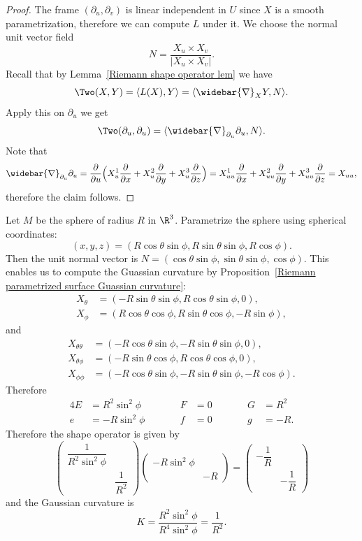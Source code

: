 \begin{proof}
The frame $(\partial_u,\partial_v)$ is linear independent in $U$ since $X$ is a smooth parametrization, therefore we can compute $L$ under it. We choose 
the normal unit vector field
\[N=\frac{X_u\times X_v}{|X_u\times X_v|}.\]
Recall that by Lemma~\ref{Riemann shape operator lem} we have
\[\Two(X,Y)=\langle L(X),Y\rangle=\langle\widebar{\nabla}_XY,N\rangle.\]
Apply this on $\partial_u$ we get
\begin{align*}
\Two(\partial_u,\partial_u)=\langle\widebar{\nabla}_{\partial_u}\partial_u,N\rangle.
\end{align*}
Note that
\[\widebar{\nabla}_{\partial_u}\partial_u=\frac{\partial}{\partial u}\Big(X^1_u\frac{\partial}{\partial x}+X^2_u\frac{\partial}{\partial y}+X^3_u\frac{\partial}{\partial z}\Big)=X^1_{uu}\frac{\partial}{\partial x}+X^2_{uu}\frac{\partial}{\partial y}+X^3_{uu}\frac{\partial}{\partial z}=X_{uu},\]
therefore the claim follows.
\end{proof}
\begin{example}
Let $M$ be the sphere of radius $R$ in $\R^3$. Parametrize the sphere using spherical coordinates:
\[(x,y,z)=(R\cos\theta\sin\phi,R\sin\theta\sin\phi,R\cos\phi).\]
Then the unit normal vector is $N=(\cos\theta\sin\phi,\sin\theta\sin\phi,\cos\phi)$. This enables us to compute the Guassian curvature by 
Proposition~\ref{Riemann parametrized surface Guassian curvature}:
\begin{align*}
X_{\theta}&=(-R\sin\theta\sin\phi,R\cos\theta\sin\phi,0),\\
X_{\phi}&=(R\cos\theta\cos\phi,R\sin\theta\cos\phi,-R\sin\phi),
\end{align*}
and
\begin{align*}
X_{\theta\theta}&=(-R\cos\theta\sin\phi,-R\sin\theta\sin\phi,0),\\
X_{\theta\phi}&=(-R\sin\theta\cos\phi,R\cos\theta\cos\phi,0),\\
X_{\phi\phi}&=(-R\cos\theta\sin\phi,-R\sin\theta\sin\phi,-R\cos\phi).
\end{align*}
Therefore
\begin{alignat*}{4}
E&=R^2\sin^2\phi&\qquad&F&=0&\qquad&G&=R^2\\
e&=-R\sin^2\phi&\qquad&f&=0&\qquad&g&=-R.
\end{alignat*}
Therefore the shape operator is given by 
\[\begin{pmatrix}
\dfrac{1}{R^2\sin^2\phi}&\\
&\dfrac{1}{R^2}
\end{pmatrix}\begin{pmatrix}
-R\sin^2\phi&\\
&-R
\end{pmatrix}=\begin{pmatrix}
-\dfrac{1}{R}&\\
&-\dfrac{1}{R}
\end{pmatrix}\]
and the Gaussian curvature is
\[K=\frac{R^2\sin^2\phi}{R^4\sin^2\phi}=\frac{1}{R^2}.\]
\end{example}
